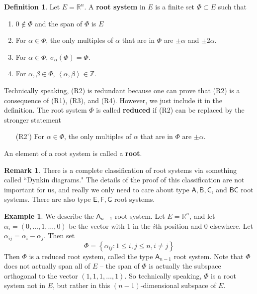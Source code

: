 \documentclass[12pt]{article}
\theoremstyle{definition}
\newtheorem{definition}[theorem]{Definition}
\newtheorem{example}[theorem]{Example}
\newtheorem{remark}[theorem]{Remark}
\numberwithin{theorem}{subsection}
\newcommand{\Z}{\mathbb{Z}}
\newcommand{\R}{\mathbb{R}}
\newcommand{\sig}{\sigma}
\newcommand{\lb}{\left\{}
\newcommand{\rb}{\right\}}
\newcommand{\la}{\left\langle}
\newcommand{\ra}{\right\rangle}
\newcommand{\tbf}{\textbf}
\begin{document}
\begin{definition}
Let $E = \R^n$. A \tbf{root system} in $E$ is a finite set $\Phi \subset E$ such that
\begin{enumerate}[(R1)]
	\item $0 \not \in \Phi$ and the span of $\Phi$ is $E$
	\item For $\alpha \in \Phi$, the only multiples of $\alpha$ that are in $\Phi$ are $\pm \alpha$ and $\pm 2 \alpha$.
	\item For $\alpha \in \Phi$, $\sig_\alpha(\Phi) = \Phi$.
	\item For $\alpha, \beta \in \Phi$, $\la \alpha, \beta \ra \in \Z$.
\end{enumerate}
Technically speaking, (R2) is redundant because one can prove that (R2) is a consequence of (R1), (R3), and (R4). However, we just include it in the definition. The root system $\Phi$ is called \tbf{reduced} if (R2) can be replaced by the stronger statement
\begin{enumerate}
	\item[(R2')] For $\alpha \in \Phi$, the only multiples of $\alpha$ that are in $\Phi$ are $\pm \alpha$.
\end{enumerate}
An element of a root system is called a \tbf{root}.
\end{definition}

\begin{remark}
There is a complete classification of root systems via something called ``Dynkin diagrams." The details of the proof of this classification are not important for us, and really we only need to care about type $\mathsf{A}, \mathsf{B}, \mathsf{C}$, and $\mathsf{BC}$ root systems. There are also type $\mathsf{E}, \mathsf{F}, \mathsf{G}$ root systems.
\end{remark}

\begin{example}
We describe the $\mathsf{A}_{n-1}$ root system. Let $E = \R^n$, and let $\alpha_i = (0, \ldots, 1, \ldots, 0)$ be the vector with 1 in the $i$th position and 0 elsewhere. Let $\alpha_{ij} = \alpha_i - \alpha_j$. Then set
\[
	\Phi = \lb \alpha_{ij} : 1 \le i,j \le n, i \neq j \rb
\]
Then $\Phi$ is a reduced root system, called the type $\mathsf{A}_{n-1}$ root system. Note that $\Phi$ does not actually span all of $E$ -- the span of $\Phi$ is actually the subspace orthogonal to the vector $(1, 1, 1, \ldots, 1)$. So technically speaking, $\Phi$ is a root system not in $E$, but rather in this $(n-1)$-dimensional subspace of $E$. 
\end{example}
\end{document}
